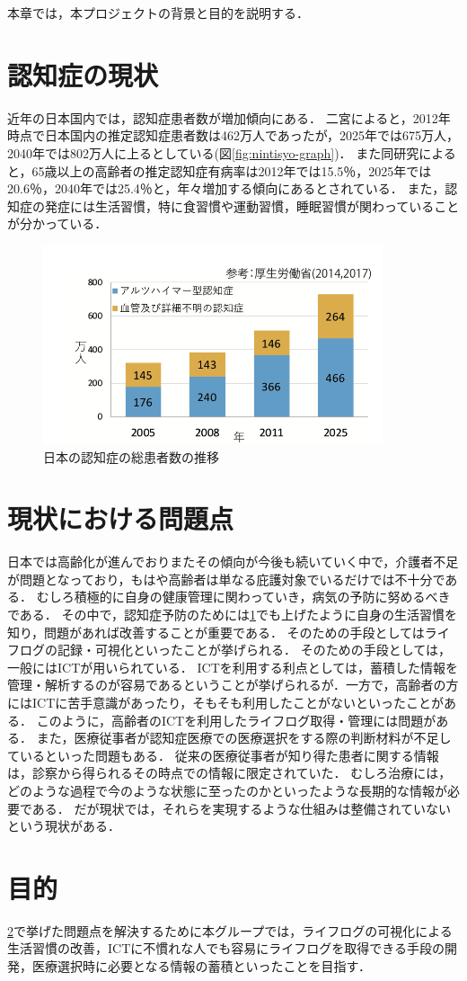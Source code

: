 \documentclass[../report]{subfiles}
\begin{document}
本章では，本プロジェクトの背景と目的を説明する．

\section{認知症の現状} \label{sec:genzyou}
近年の日本国内では，認知症患者数が増加傾向にある．
二宮によると，2012年時点で日本国内の推定認知症患者数は462万人であったが，2025年では675万人，2040年では802万人に上るとしている(図\ref{fig:nintisyo-graph})．
また同研究によると，65歳以上の高齢者の推定認知症有病率は2012年では15.5％，2025年では20.6％，2040年では25.4％と，年々増加する傾向にあるとされている．
また，認知症の発症には生活習慣，特に食習慣や運動習慣，睡眠習慣が関わっていることが分かっている\cite{seikatsu}．
\begin{figure}[htbp]
    \begin{center}
        \includegraphics[width=10cm]{imgs/ninchisyo-graph.png}
        \caption{日本の認知症の総患者数の推移}
        \label{fig:ninchisyo-graph}
    \end{center}
\end{figure}

\section{現状における問題点} \label{sec:mondai}
日本では高齢化が進んでおりまたその傾向が今後も続いていく中で，介護者不足が問題となっており，もはや高齢者は単なる庇護対象でいるだけでは不十分である．
むしろ積極的に自身の健康管理に関わっていき，病気の予防に努めるべきである．
その中で，認知症予防のためには\ref{sec:genzyou}でも上げたように自身の生活習慣を知り，問題があれば改善することが重要である．
そのための手段としてはライフログの記録・可視化といったことが挙げられる\cite{lifelog}．
そのための手段としては，一般にはICTが用いられている．
ICTを利用する利点としては，蓄積した情報を管理・解析するのが容易であるということが挙げられるが．一方で，高齢者の方にはICTに苦手意識があったり，そもそも利用したことがないといったことがある．
このように，高齢者のICTを利用したライフログ取得・管理には問題がある．
また，医療従事者が認知症医療での医療選択をする際の判断材料が不足しているといった問題もある．
従来の医療従事者が知り得た患者に関する情報は，診察から得られるその時点での情報に限定されていた．
むしろ治療には，どのような過程で今のような状態に至ったのかといったような長期的な情報が必要である．
だが現状では，それらを実現するような仕組みは整備されていないという現状がある．

\section{目的}
\ref{sec:mondai}で挙げた問題点を解決するために本グループでは，ライフログの可視化による生活習慣の改善，ICTに不慣れな人でも容易にライフログを取得できる手段の開発，医療選択時に必要となる情報の蓄積といったことを目指す．
\end{document}
